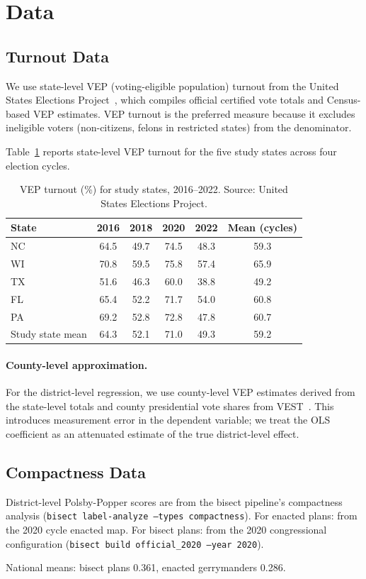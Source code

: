 \section{Data}

\subsection{Turnout Data}

We use state-level VEP (voting-eligible population) turnout from the
United States Elections Project~\citep{mcdonald2002turnout}, which
compiles official certified vote totals and Census-based VEP estimates.
VEP turnout is the preferred measure because it excludes ineligible voters
(non-citizens, felons in restricted states) from the denominator.

Table~\ref{tab:turnout-summary} reports state-level VEP turnout for the
five study states across four election cycles.

\begin{table}[h]
\centering\small
\caption{VEP turnout (\%) for study states, 2016--2022.
Source: United States Elections Project.}
\label{tab:turnout-summary}
\begin{tabular}{lccccc}
\toprule
State & 2016 & 2018 & 2020 & 2022 & Mean (cycles) \\
\midrule
NC & 64.5 & 49.7 & 74.5 & 48.3 & 59.3 \\
WI & 70.8 & 59.5 & 75.8 & 57.4 & 65.9 \\
TX & 51.6 & 46.3 & 60.0 & 38.8 & 49.2 \\
FL & 65.4 & 52.2 & 71.7 & 54.0 & 60.8 \\
PA & 69.2 & 52.8 & 72.8 & 47.8 & 60.7 \\
\midrule
Study state mean & 64.3 & 52.1 & 71.0 & 49.3 & 59.2 \\
\bottomrule
\end{tabular}
\end{table}

\paragraph{County-level approximation.}
For the district-level regression, we use county-level VEP estimates
derived from the state-level totals and county presidential vote shares
from VEST~\citep{vest2022}. This introduces measurement error in the
dependent variable; we treat the OLS coefficient as an attenuated estimate
of the true district-level effect.

\subsection{Compactness Data}

District-level Polsby-Popper scores are from the bisect pipeline's
compactness analysis (\texttt{bisect label-analyze --types compactness}).
For enacted plans: from the 2020 cycle enacted map.
For bisect plans: from the 2020 congressional configuration
(\texttt{bisect build official\_2020 --year 2020}).

National means: bisect plans 0.361, enacted gerrymanders 0.286.
